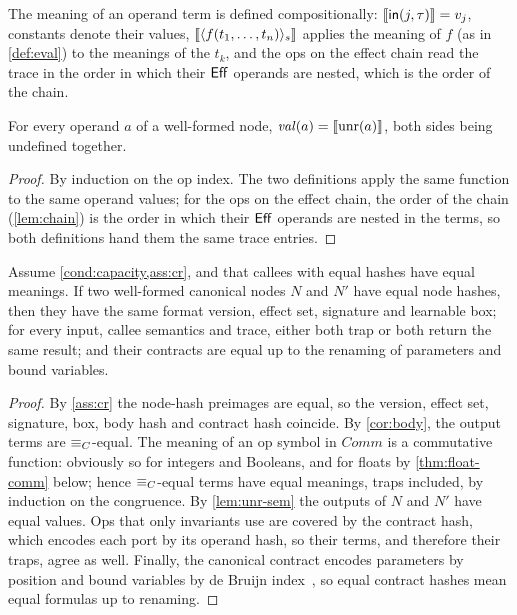 The meaning of an operand term is defined compositionally: $\llbracket \mathsf{in}(j,\tau) \rrbracket=v_j$,
constants denote their values, $\llbracket \langle f(t_1,\dots,t_n)\rangle_s \rrbracket$ applies the meaning of
$f$ (as in \cref{def:eval}) to the meanings of the $t_k$, and the ops on the effect chain read
the trace in the order in which their $\mathsf{Eff}$ operands are nested, which is the order of the
chain.

\begin{lemma}\label{lem:unr-sem}
For every operand $a$ of a well-formed node, $\mathit{val}(a)=\llbracket \mathrm{unr}(a) \rrbracket$, both sides being
undefined together.
\end{lemma}
\begin{proof}
By induction on the op index. The two definitions apply the same function to the same operand
values; for the ops on the effect chain, the order of the chain (\cref{lem:chain}) is the order
in which their $\mathsf{Eff}$ operands are nested in the terms, so both definitions hand them the same
trace entries.
\end{proof}

\begin{theorem}\label{thm:hash-meaning}
Assume \cref{cond:capacity,ass:cr}, and that callees with equal hashes have equal meanings. If
two well-formed canonical nodes $N$ and $N'$ have equal node hashes, then they have the same
format version, effect set, signature and learnable box; for every input, callee semantics and
trace, either both trap or both return the same result; and their contracts are equal up to
the renaming of parameters and bound variables.
\end{theorem}
\begin{proof}
By \cref{ass:cr} the node-hash preimages are equal, so the version, effect set, signature, box,
body hash and contract hash coincide. By \cref{cor:body}, the output terms are $\equiv_{C}$-equal. The
meaning of an op symbol in $\mathit{Comm}$ is a commutative function: obviously so for integers
and Booleans, and for floats by \cref{thm:float-comm} below; hence $\equiv_{C}$-equal terms have
equal meanings, traps included, by induction on the congruence. By \cref{lem:unr-sem} the
outputs of $N$ and $N'$ have equal values. Ops that only invariants use are covered by the
contract hash, which encodes each port by its operand hash, so their terms, and therefore their
traps, agree as well. Finally, the canonical contract encodes parameters by position and bound
variables by de Bruijn index~\cite{maziarz2021hashing}, so equal contract hashes mean equal
formulas up to renaming.
\end{proof}


